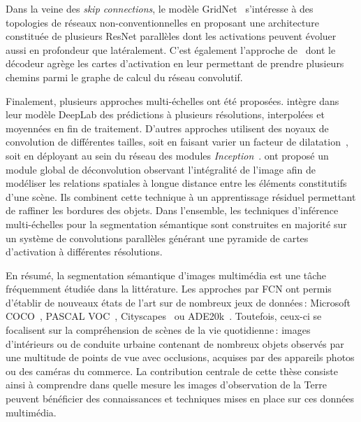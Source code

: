 Dans la veine des \emph{skip connections}, le modèle GridNet~\cite{fourure_residual_2017} s'intéresse à des topologies de réseaux non-conventionnelles en proposant une architecture constituée de plusieurs ResNet parallèles dont les activations peuvent évoluer aussi en profondeur que latéralement. C'est également l'approche de~\citet{liu_path_2018} dont le décodeur agrège les cartes d'activation en leur permettant de prendre plusieurs chemins parmi le graphe de calcul du réseau convolutif.

Finalement, plusieurs approches multi-échelles ont été proposées. \citet{chen_deeplab_2018} intègre dans leur modèle DeepLab des prédictions à plusieurs résolutions, interpolées et moyennées en fin de traitement. D'autres approches utilisent des noyaux de convolution de différentes tailles, soit en faisant varier un facteur de dilatation~\cite{yu_multi-scale_2015}, soit en déployant au sein du réseau des modules \emph{Inception}~\cite{szegedy_going_2015,nekrasov_global_2016,zhao_pyramid_2017}. \citet{peng_large_2017} ont proposé un module global de déconvolution observant l'intégralité de l'image afin de modéliser les relations spatiales à longue distance entre les éléments constitutifs d'une scène. Ils combinent cette technique à un apprentissage résiduel permettant de raffiner les bordures des objets. Dans l'ensemble, les techniques d'inférence multi-échelles pour la segmentation sémantique sont construites en majorité sur un système de convolutions parallèles générant une pyramide de cartes d'activation à différentes résolutions.

En résumé, la segmentation sémantique d'images multimédia est une tâche fréquemment étudiée dans la littérature. Les approches par \gls{FCN} ont permis d'établir de nouveaux états de l'art sur de nombreux jeux de données\,: Microsoft COCO~\cite{lin_microsoft_2014}, PASCAL VOC~\cite{everingham_pascal_2014}, Cityscapes~\cite{cordts_cityscapes_2016} ou ADE20k~\cite{zhou_scene_2017}. Toutefois, ceux-ci se focalisent sur la compréhension de scènes de la vie quotidienne\,: images d'intérieurs ou de conduite urbaine contenant de nombreux objets observés par une multitude de points de vue avec occlusions, acquises par des appareils photos ou des caméras du commerce. La contribution centrale de cette thèse consiste ainsi à comprendre dans quelle mesure les images d'observation de la Terre peuvent bénéficier des connaissances et techniques mises en place sur ces données multimédia.


